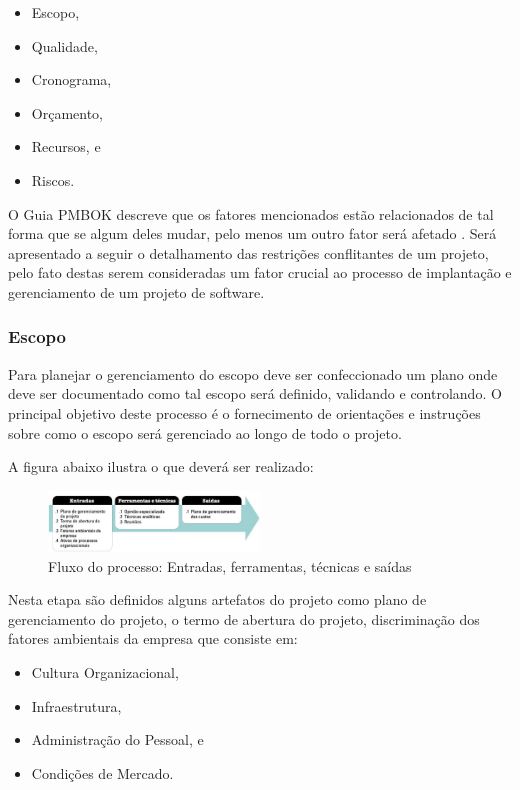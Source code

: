 \documentclass{acm_proc_article-sp}
\begin{document}
\begin{itemize}
\item Escopo,
\item Qualidade,
\item Cronograma,
\item Orçamento,
\item Recursos, e 
\item Riscos.
\end{itemize}


O Guia PMBOK descreve que os fatores mencionados estão relacionados de tal forma que se algum deles mudar, pelo menos um outro fator será afetado \cite{pmbok:nAgil}. Será apresentado a seguir o detalhamento das restrições conflitantes de um projeto, pelo fato destas serem consideradas um fator crucial ao processo de implantação e gerenciamento de um projeto de software.  

\subsubsection*{Escopo}
Para planejar o gerenciamento do escopo deve ser confeccionado um plano onde deve ser documentado como tal escopo será definido, validando e controlando. O principal objetivo deste processo é o fornecimento de orientações e instruções sobre como o escopo será gerenciado ao longo de todo o projeto.

A figura abaixo ilustra o que deverá ser realizado:

\begin{figure}[h]
\centering %
\includegraphics[width=0.5\textwidth]{entradaescopo.jpg} %
\caption{Fluxo do processo: Entradas, ferramentas, técnicas e saídas \cite{pmbok:nAgil}}
\end{figure}

Nesta etapa são definidos alguns artefatos do projeto como plano de gerenciamento do projeto, o termo de abertura do projeto, discriminação dos fatores ambientais da empresa que consiste em:

\begin{itemize}
\item Cultura Organizacional,
\item Infraestrutura,
\item Administração do Pessoal, e
\item Condições de Mercado.
\end{itemize} 
\end{document}
